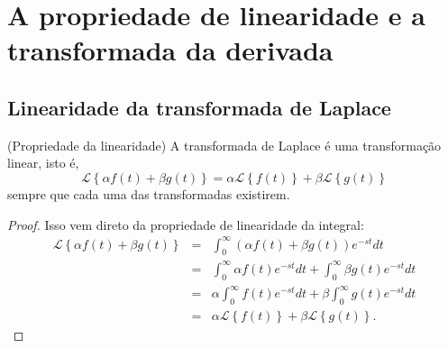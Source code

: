 \chapter{A propriedade de linearidade e a transformada da derivada}
\section{Linearidade da transformada de Laplace}
\begin{teo}{\label{prop_lin}}(Propriedade da linearidade)
A transformada de Laplace é uma transformação linear, isto é,
\begin{equation}
\mathcal{L }\left\{\alpha f(t)+\beta g(t)\right\}=\alpha \mathcal{L }\left\{ f(t)\right\}+\beta\mathcal{L }\left\{g(t)\right\}
\end{equation}
sempre que cada uma das transformadas existirem.
\end{teo}
\begin{proof}
Isso vem direto da propriedade de linearidade da integral:
\begin{eqnarray*}
\mathcal{L }\left\{\alpha f(t)+\beta g(t)\right\}&=&\int_0^\infty \left(\alpha f(t)+\beta g(t)\right)e^{-st}dt\\
&=&\int_0^\infty \alpha f(t)e^{-st}dt+\int_0^\infty\beta g(t)e^{-st}dt\\
&=&\alpha\int_0^\infty  f(t)e^{-st}dt+\beta\int_0^\infty g(t)e^{-st}dt\\
&=&\alpha \mathcal{L }\left\{ f(t)\right\}+\beta\mathcal{L }\left\{g(t)\right\}.
\end{eqnarray*}
\end{proof}
